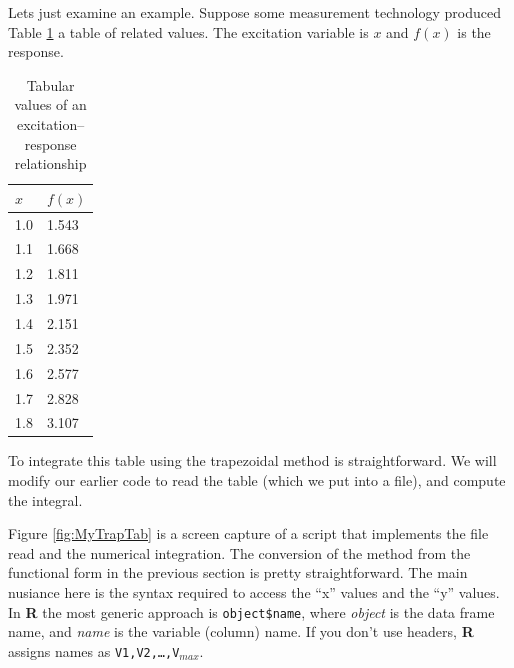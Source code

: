Lets just examine an example.  Suppose some measurement technology produced Table \ref{tab:MyIntegralTable} a table of related values.   The excitation variable is $x$ and $f(x)$ is the response.   

\begin{table}[h!]
   \centering
   \caption{Tabular values of an excitation--response relationship}
   \begin{tabular}{p{1in}p{1in}} 
   $x$ & $f(x)$ \\
   \hline
   \hline
   1.0 & 1.543 \\
   1.1 & 1.668 \\
   1.2 & 1.811 \\
   1.3 & 1.971 \\
   1.4 & 2.151 \\
   1.5 & 2.352 \\
   1.6 & 2.577 \\
   1.7 & 2.828 \\
   1.8 & 3.107 \\
   \hline
   \end{tabular}
   \label{tab:MyIntegralTable}
\end{table}

To integrate this table using the trapezoidal method is straightforward.  We will modify our earlier code to read the table (which we put into a file), and compute the integral.  

Figure \ref{fig:MyTrapTab} is a screen capture of a script that implements the file read and the numerical integration.
The conversion of the method from the functional form in the previous section is pretty straightforward.  
The main nusiance here is the syntax required to access the ``x'' values and the ``y'' values.   
In \textbf{R} the most generic approach is \texttt{object\$name}, where \textit{object} is the data frame name, and \textit{name} is the variable (column) name.  If you don't use headers, \textbf{R} assigns names as \texttt{V1,V2,\dots,V$_{max}$}.   


